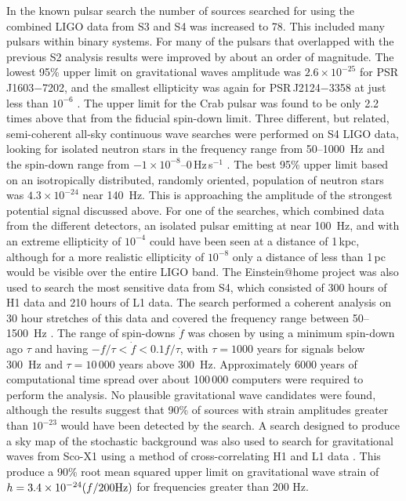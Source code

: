 \documentclass{article}
\begin{document}
In the known pulsar search the number of sources searched for using the combined
LIGO data from S3 and S4 was increased to 78. This included many pulsars within
binary systems. For many of the pulsars that overlapped with the previous S2
analysis results were improved by about an order of magnitude. The lowest 95\%
upper limit on gravitational waves amplitude was $2.6\times10^{-25}$ for
PSR\,J1603$-$7202, and the smallest ellipticity was again for PSR\,J2124$-$3358
at just less than $10^{-6}$ \cite{Abbott:2007d}. The upper limit for the Crab
pulsar was found to be only 2.2 times above that from the fiducial spin-down
limit. Three different, but related, semi-coherent all-sky continuous
wave searches were performed on S4 LIGO data, looking for isolated neutron stars
in the frequency range from 50--1000~Hz and the spin-down range from
$-1\times10^{-8}$--0\,Hz\,s$^{-1}$ \cite{Abbott:2008e}. The best 95\% upper
limit based on an isotropically distributed, randomly oriented, population of
neutron stars was $4.3\times10^{-24}$ near 140~Hz. This is approaching the
amplitude of the strongest potential signal discussed above. For one of the
searches, which combined data from the different detectors, an isolated pulsar
emitting at near 100~Hz, and with an extreme ellipticity of $10^{-4}$ could
have been seen at a distance of 1\,kpc, although for a more realistic
ellipticity of $10^{-8}$ only a distance of less than 1\,pc would be visible
over the entire LIGO band. The Einstein@home project \cite{eath} was also used
to search the most sensitive data from S4, which consisted of 300 hours of H1
data and 210 hours of L1 data. The search performed a coherent analysis on 30
hour stretches of this data and covered the frequency range between
50--1500~Hz \cite{Abbott:2008f}. The range of spin-downs $\dot{f}$ was chosen
by using a minimum spin-down ago $\tau$ and having $-f/\tau < \dot{f} <
0.1f/\tau$, with $\tau = 1000$ years for signals below 300~Hz and $\tau = 
10\,000$ years above 300~Hz. Approximately 6000 years of computational time
spread over about 100\,000 computers were required to perform the analysis. No
plausible gravitational wave candidates were found, although the results suggest
that 90\% of sources with strain amplitudes greater than $10^{-23}$ would have
been detected by the search. A search designed to produce a sky map of the
stochastic background was also used to search for gravitational waves from
Sco-X1 using a method of cross-correlating H1 and L1 data \cite{Abbott:2007f}.
This produce a 90\% root mean squared upper limit on gravitational wave strain
of $h = 3.4\times10^{-24}(f/200 {\rm Hz})$ for frequencies greater than 200 Hz.
\end{document}

